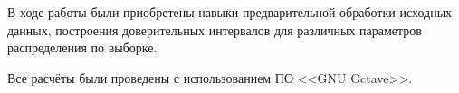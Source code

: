 \Conclusion

В ходе работы были приобретены навыки предварительной обработки исходных данных, построения доверительных интервалов для различных параметров распределения по выборке.

Все расчёты были проведены с использованием ПО <<GNU Octave>>.
